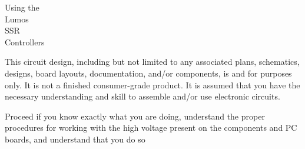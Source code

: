 \documentclass[letterpaper,twoside,onecolumn,openright,final]{memoir}
\begin{document}
  \def\lightstate#1#2#3{%
    \ifthenelse{\equal{#1}{on}}{\draw [thick] (#2,\y+#3) circle (.1);}{%
      \ifthenelse{\equal{#1}{off}}{\draw [thick, fill, color=gray] (#2,\y+#3) circle (.1);}{%
        \ifthenelse{\equal{#1}{sfd}}{\draw [thick, dashed] (#2,\y+#3) circle (.1);}{%
          \ifthenelse{\equal{#1}{x}}{\draw [thick, fill, color=white] (#2,\y+#3) circle (.1);\draw (#2,\y+#3) -- +(-.1,-.1) -- +(.1,.1) -- +(0,0) -- +(-.1,.1) -- +(.1,-.1);}{%
            \ifthenelse{\equal{#1}{sfl}}{\draw [thick, dotted] (#2,\y+#3) circle (.1);}{%
              \ifthenelse{\equal{#1}{ffl}}{\draw [thick, dotted] (#2,\y+#3) circle (.1);\draw [thick] (#2,\y+#3) circle (.05);}{%
                \ifthenelse{\equal{#1}{blk}}{\draw [thick] (#2,\y+#3) circle (.1); \draw [thick] (#2,\y+#3) -- +(-.1,0) -- +(.1,0) -- +(0,0) -- +(0,-.1) -- +(0,.1);}{%
                  \ifthenelse{\equal{#1}{ffd}}{\draw [thick, dashed] (#2,\y+#3) circle (.1); \draw [thick] (#2,\y+#3) circle (.05);}{%
                    \ifthenelse{\equal{#1}{sss}}{\draw [thick, dashed] (#2,\y+#3) circle (.1); \draw [thick] (#2,\y+#3) circle (.02);}{%
 		    }%
		  }%
	        }%
  	      }%
 	    }%
 	  }%
  	}%
      }%
    }%
  }%

\thispagestyle{empty}
\begin{center}
{\fontsize{48}{50}\selectfont
Using the\\Lumos\TM\\SSR\\Controllers\\\strut

\vfill
}
\end{center}

\newpage
\begin{center}


\end{center}

This circuit design, including but not limited to any associated plans, schematics, designs, board layouts, documentation, 
and/or components, is  and for  purposes only. It is not a finished consumer-grade product.
It is assumed that you have the necessary understanding and skill to assemble and/or use electronic circuits.

Proceed  if you know exactly what you are doing, understand the proper procedures for working with the high voltage present on the components and PC boards, and understand that you do so 
\end{document}
